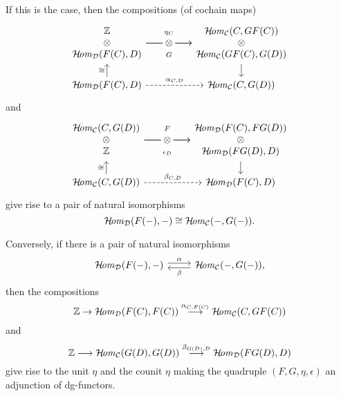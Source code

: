 {If this is the case, then the compositions 
(of cochain maps)
\[
\begin{tikzcd}[column sep=huge, row sep=scriptsize]
{
\begin{matrix}
\ZZ \\
\otimes \\
{\HHom_{\Dd}(F(C),D)}
\end{matrix}
}
\ar[r,"{
\begin{matrix}
\eta_C\\
\\
G
\end{matrix}
}"description]
\ar[r,"\textstyle{\otimes}"description]
&
{
\begin{matrix}
\HHom_{\Cc}(C,GF(C)) \\
\otimes \\
\HHom_{\Cc}(GF(C),G(D))
\end{matrix}
}\ar[d]\\
{\HHom_{\Dd}(F(C),D)}
\ar[u,"{\cong}"]\ar[r,dashed,"{\alpha_{C,D}}"]&
\HHom_{\Cc}(C,G(D))
\end{tikzcd}
\]
and
\[
\begin{tikzcd}[column sep=huge, row sep=scriptsize]
{
\begin{matrix}
{\HHom_{\Cc}(C,G(D))} \\
\otimes \\
{\ZZ}
\end{matrix}
}
\ar[r,"{
\begin{matrix}
F\\
\\
\epsilon_D
\end{matrix}
}"description]
\ar[r,"\textstyle{\otimes}"description]
&
{
\begin{matrix}
\HHom_{\Dd}(F(C),FG(D)) \\
\otimes \\
\HHom_{\Dd}(FG(D),D)
\end{matrix}
}\ar[d]\\
{\HHom_{\Cc}(C,G(D))}
\ar[u,"{\cong}"]\ar[r,dashed,"{\beta_{C,D}}"]&
{\HHom_{\Dd}(F(C),D)}
\end{tikzcd}
\]
give rise to a pair of natural isomorphisms
\[
\operatorname{\mathcal{H}\!\mathit{om}}_{{\cal D}}(F(-),-)\cong\operatorname{\mathcal{H}\!\mathit{om}}_{{\cal C}}(-,G(-)).
\]

Conversely, if there is a pair of natural isomorphisms
\[
\begin{tikzcd}
\HHom_{\Dd}(F(-),-)
\ar[r,shift left,"{\alpha}"]&
\ar[l,shift left,"{\beta}"]
\HHom_{\Cc}(-,G(-)),
\end{tikzcd}
\]
then the compositions
\[
{\mathbb Z}\to\operatorname{\mathcal{H}\!\mathit{om}}_{{\cal D}}(F(C),F(C))
\stackrel{{\alpha_{C,F(C)}}}{\longrightarrow}
\operatorname{\mathcal{H}\!\mathit{om}}_{{\cal C}}(C,GF(C))
\]
and
\[
{\mathbb Z}\longrightarrow\operatorname{\mathcal{H}\!\mathit{om}}_{{\cal C}}(G(D),G(D))
\stackrel{{\beta_{G(D),D}}}{\longrightarrow}
\operatorname{\mathcal{H}\!\mathit{om}}_{{\cal D}}(FG(D),D)
\]
give rise to the unit $\eta$ and the counit $\eta$ making the 
quadruple $(F,G,\eta,\epsilon)$ an adjunction of dg-functors.
}

